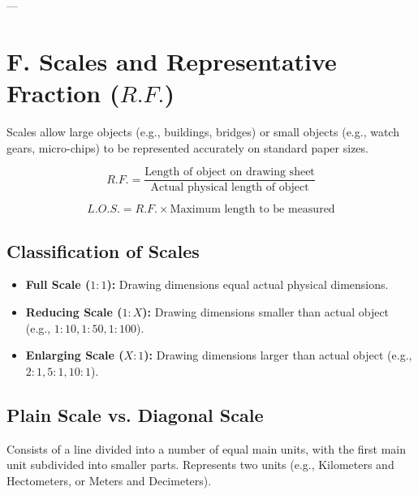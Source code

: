---

\section{F. Scales and Representative Fraction ($R.F.$)}

Scales allow large objects (e.g., buildings, bridges) or small objects (e.g., watch gears, micro-chips) to be represented accurately on standard paper sizes.

\begin{keyequation}
\begin{equation}
    R.F. = \frac{\text{Length of object on drawing sheet}}{\text{Actual physical length of object}}
\end{equation}
\end{keyequation}

\begin{keyequation}
\begin{equation}
    L.O.S. = R.F. \times \text{Maximum length to be measured}
\end{equation}
\end{keyequation}

\subsection{Classification of Scales}
\begin{itemize}
    \item \textbf{Full Scale ($1:1$):} Drawing dimensions equal actual physical dimensions.
    \item \textbf{Reducing Scale ($1:X$):} Drawing dimensions smaller than actual object (e.g., $1:10, 1:50, 1:100$).
    \item \textbf{Enlarging Scale ($X:1$):} Drawing dimensions larger than actual object (e.g., $2:1, 5:1, 10:1$).
\end{itemize}

\subsection{Plain Scale vs. Diagonal Scale}

\begin{definition}
Consists of a line divided into a number of equal main units, with the first main unit subdivided into smaller parts. Represents two units (e.g., Kilometers and Hectometers, or Meters and Decimeters).
\end{definition}

